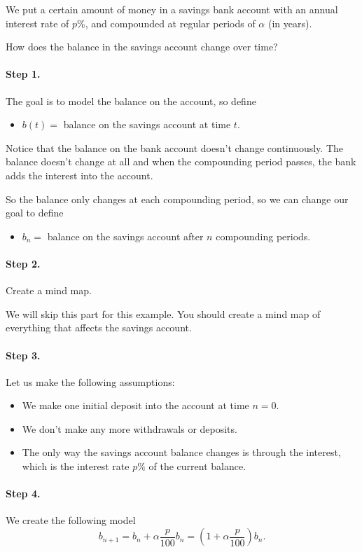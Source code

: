 \begin{example}
We put a certain amount of money in a savings bank account with an annual interest rate of $p\%$, and compounded at regular periods of $\alpha$ (in years).

How does the balance in the savings account change over time? \\

\paragraph{Step 1.} The goal is to model the balance on the account, so define
\begin{itemize}
	\item $b(t)=$ balance on the savings account at time $t$.
\end{itemize}

Notice that the balance on the bank account doesn't change continuously. The balance doesn't change at all and when the compounding period passes, the bank adds the interest into the account.

So the balance only changes at each compounding period, so we can change our goal to define
\begin{itemize}
	\item $b_n=$ balance on the savings account after $n$ compounding periods.
\end{itemize}


\paragraph{Step 2.} Create a mind map.

We will skip this part for this example. You should create a mind map of everything that affects the savings account.

\paragraph{Step 3.} Let us make the following assumptions:
\begin{itemize}
	\item We make one initial deposit into the account at time $n=0$.
	\item We don't make any more withdrawals or deposits.
	\item The only way the savings account balance changes is through the interest, which is the interest rate $p\%$ of the current balance.
\end{itemize}

\paragraph{Step 4.} We create the following model
$$
b_{n+1}=b_n + \alpha \frac{p}{100} b_n = \left( 1 + \alpha \frac{p}{100}\right) b_n.
$$
	
\end{example}


